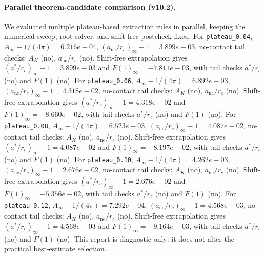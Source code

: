 \paragraph{Parallel theorem-candidate comparison (v10.2).}
We evaluated multiple plateau-based extraction rules in parallel, keeping the numerical sweep, root solver, and shift-free postcheck fixed. For \texttt{plateau_0.04}, $A_\infty-1/(4\pi)=6.216e-04$, $(a_{\mathrm{nc}}/r_c)_\infty-1=3.899e-03$, no-contact tail checks: $A_K$ (no), $a_{\mathrm{nc}}/r_c$ (no). Shift-free extrapolation gives $(a^*/r_c)_\infty-1=3.899e-03$ and $F(1)_\infty=-7.811e-03$, with tail checks $a^*/r_c$ (no) and $F(1)$ (no). For \texttt{plateau_0.06}, $A_\infty-1/(4\pi)=6.892e-03$, $(a_{\mathrm{nc}}/r_c)_\infty-1=4.318e-02$, no-contact tail checks: $A_K$ (no), $a_{\mathrm{nc}}/r_c$ (no). Shift-free extrapolation gives $(a^*/r_c)_\infty-1=4.318e-02$ and $F(1)_\infty=-8.660e-02$, with tail checks $a^*/r_c$ (no) and $F(1)$ (no). For \texttt{plateau_0.08}, $A_\infty-1/(4\pi)=6.523e-03$, $(a_{\mathrm{nc}}/r_c)_\infty-1=4.087e-02$, no-contact tail checks: $A_K$ (no), $a_{\mathrm{nc}}/r_c$ (no). Shift-free extrapolation gives $(a^*/r_c)_\infty-1=4.087e-02$ and $F(1)_\infty=-8.197e-02$, with tail checks $a^*/r_c$ (no) and $F(1)$ (no). For \texttt{plateau_0.10}, $A_\infty-1/(4\pi)=4.262e-03$, $(a_{\mathrm{nc}}/r_c)_\infty-1=2.676e-02$, no-contact tail checks: $A_K$ (no), $a_{\mathrm{nc}}/r_c$ (no). Shift-free extrapolation gives $(a^*/r_c)_\infty-1=2.676e-02$ and $F(1)_\infty=-5.356e-02$, with tail checks $a^*/r_c$ (no) and $F(1)$ (no). For \texttt{plateau_0.12}, $A_\infty-1/(4\pi)=7.292e-04$, $(a_{\mathrm{nc}}/r_c)_\infty-1=4.568e-03$, no-contact tail checks: $A_K$ (no), $a_{\mathrm{nc}}/r_c$ (no). Shift-free extrapolation gives $(a^*/r_c)_\infty-1=4.568e-03$ and $F(1)_\infty=-9.164e-03$, with tail checks $a^*/r_c$ (no) and $F(1)$ (no). This report is diagnostic only: it does not alter the practical best-estimate selection.
